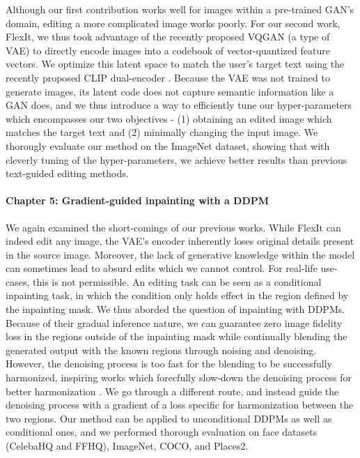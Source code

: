 Although our first contribution works well for images within a pre-trained \ac{GAN}'s  domain, 
editing a more complicated image works poorly. For our second work, FlexIt, we thus took advantage of the 
recently proposed  VQGAN \citep{esser2021taming} (a type of \ac{VAE}) to directly encode images into a codebook of vector-quantized
feature vectors. We optimize this latent space to match the user's target text using the recently proposed 
CLIP dual-encoder \citep{radford2021learning}. Because the \ac{VAE} was not trained to generate images,
its latent code does not capture semantic information like a \ac{GAN} does, and we thus introduce
 a way to efficiently tune our hyper-parameters 
 which encompasses our two 
objectives - (1) obtaining an edited image which matches the target text and (2) minimally changing 
the input image. We thorougly evaluate our method on the ImageNet dataset, showing that with cleverly
tuning of the hyper-parameters, we achieve better results than previous text-guided editing methods.


\paragraph{Chapter 5: Gradient-guided inpainting with a \ac{DDPM}}

We again examined the short-comings of our previous works. While FlexIt can indeed edit any image, 
the \ac{VAE}'s encoder inherently loses original details present in the source image. Moreover,
the lack of generative knowledge within the model can sometimes lead to absurd edits which 
we cannot control. For real-life 
use-cases, this is not permissible. An editing task can be seen as a conditional inpainting 
task, in which the condition only holds effect in the region defined by the inpainting mask. We thus 
aborded the question of inpainting with \ac{DDPM}s. Because of their gradual inference nature, we can 
guarantee zero image fidelity loss in the regions outside of the inpainting mask while continually 
blending the generated output with the known regions through noising and denoising. However, the 
denoising process is too fast for the blending to be successfully harmonized, inspiring works which 
forecfully slow-down the denoising process for better harmonization \citep{lugmayr2022repaint}. We 
go through a different route, and instead guide the denoising process with a gradient of a loss 
specific for harmonization between the two regions. Our method can be applied to unconditional \ac{DDPM}s 
as well as conditional ones, and we performed thorough evaluation on face datasets (CelebaHQ and FFHQ),
 ImageNet, COCO, 
and Places2. 



















